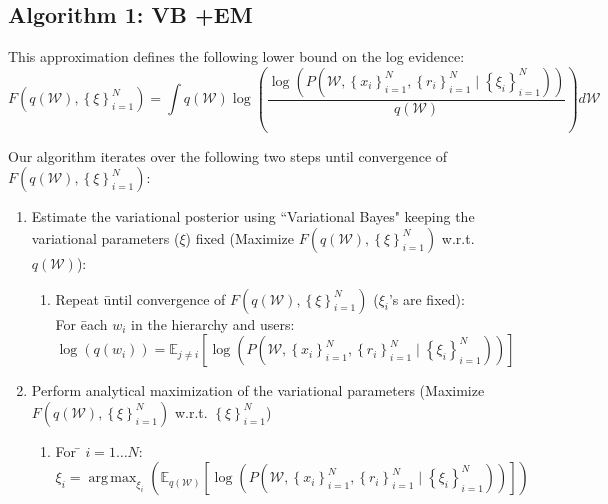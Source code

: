 \documentclass[11pt, a4paper]{article}
\DeclareMathOperator*{\argmax}{arg\,max}
\def\>{ \right\rangle }
\begin{document}
\subsection{Algorithm 1: VB +EM}
\noindent This approximation defines the following lower bound on the log evidence:
$$F\left(q(\mathcal{W}),\left\{\xi\right\}_{i=1}^N\right)=\int q(\mathcal{W})\log\left(\frac{\log\left(P\left(\mathcal{W},\left\{x_i\right\}_{i=1}^N,\left\{r_i\right\}_{i=1}^N \mid \left\{\xi_i\right\}_{i=1}^N\right)\right)}{q(\mathcal{W})} \right) d\mathcal{W}$$



\noindent Our algorithm  iterates over the following two steps until convergence of $F\left(q(\mathcal{W}),\left\{\xi\right\}_{i=1}^N\right)$:
\begin{enumerate}
                                              \item Estimate the variational posterior using ``Variational Bayes" keeping the variational parameters ($\xi$) fixed (Maximize $F\left(q(\mathcal{W}),\left\{\xi\right\}_{i=1}^N\right)$ w.r.t. $q(\mathcal{W})$):
                                              \begin{enumerate}
                                                \item \begin{tabbing}
Repeat \= until convergence of $F\left(q(\mathcal{W}),\left\{\xi\right\}_{i=1}^N\right)$ ($\xi_i$'s are fixed): \\
\>For \=each $w_i$ in the hierarchy and users:\\
\>\>$\log\left(q(w_i)\right)=\mathbb{E}_{j\neq i} \left[\log\left(P\left(\mathcal{W},\left\{x_i\right\}_{i=1}^N,\left\{r_i\right\}_{i=1}^N \mid \left\{\xi_i\right\}_{i=1}^N\right)\right)\right]$\\

\end{tabbing}



                                              \end{enumerate}
                                              \item Perform analytical maximization of the variational parameters (Maximize $F\left(q(\mathcal{W}),\left\{\xi\right\}_{i=1}^N\right)$ w.r.t. $\left\{\xi\right\}_{i=1}^N$)
                                               \begin{enumerate}
                                                \item \begin{tabbing}
For \= $i=1\dots N$:\\
\>$\xi_i=\argmax_{\xi_i}\left(\mathbb{E}_{q(\mathcal{W})} \left[\log\left(P\left(\mathcal{W},\left\{x_i\right\}_{i=1}^N,\left\{r_i\right\}_{i=1}^N \mid \left\{\xi_i\right\}_{i=1}^N\right)\right)\right]\right)$\\
\end{tabbing}
                                            \end{enumerate}
                                              \end{enumerate}
\end{document}

